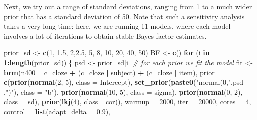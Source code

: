 \documentclass[12pt,]{krantz}
\newenvironment{Shaded}{\begin{snugshade}}{\end{snugshade}}
\newcommand{\CommentTok}[1]{\textcolor[rgb]{0.56,0.35,0.01}{\textit{#1}}}
\newcommand{\ControlFlowTok}[1]{\textcolor[rgb]{0.13,0.29,0.53}{\textbf{#1}}}
\newcommand{\DataTypeTok}[1]{\textcolor[rgb]{0.13,0.29,0.53}{#1}}
\newcommand{\DecValTok}[1]{\textcolor[rgb]{0.00,0.00,0.81}{#1}}
\newcommand{\FloatTok}[1]{\textcolor[rgb]{0.00,0.00,0.81}{#1}}
\newcommand{\KeywordTok}[1]{\textcolor[rgb]{0.13,0.29,0.53}{\textbf{#1}}}
\newcommand{\NormalTok}[1]{#1}
\newcommand{\OperatorTok}[1]{\textcolor[rgb]{0.81,0.36,0.00}{\textbf{#1}}}
\newcommand{\StringTok}[1]{\textcolor[rgb]{0.31,0.60,0.02}{#1}}
\theoremstyle{definition}
\theoremstyle{definition}
\theoremstyle{definition}
\theoremstyle{remark}
\begin{document}
Next, we try out a range of standard deviations, ranging from 1 to a much wider prior that has a standard deviation of 50. Note that such a sensitivity analysis takes a very long time: here, we are running 11 models, where each model involves a lot of iterations to obtain stable Bayes factor estimates.

\begin{Shaded}
\begin{Highlighting}[]
\NormalTok{prior_sd <-}\StringTok{ }\KeywordTok{c}\NormalTok{(}\DecValTok{1}\NormalTok{, }\FloatTok{1.5}\NormalTok{, }\DecValTok{2}\NormalTok{,}\FloatTok{2.5}\NormalTok{, }\DecValTok{5}\NormalTok{, }\DecValTok{8}\NormalTok{, }\DecValTok{10}\NormalTok{, }\DecValTok{20}\NormalTok{, }\DecValTok{40}\NormalTok{, }\DecValTok{50}\NormalTok{)}
\NormalTok{BF <-}\StringTok{ }\KeywordTok{c}\NormalTok{()}
\ControlFlowTok{for}\NormalTok{ (i }\ControlFlowTok{in} \DecValTok{1}\OperatorTok{:}\KeywordTok{length}\NormalTok{(prior_sd)) \{}
\NormalTok{    psd <-}\StringTok{ }\NormalTok{prior_sd[i]}
      \CommentTok{# for each prior we fit the model}
\NormalTok{    fit <-}\StringTok{ }\KeywordTok{brm}\NormalTok{(n400 }\OperatorTok{~}\StringTok{ }\NormalTok{c_cloze }\OperatorTok{+}\StringTok{ }\NormalTok{(c_cloze }\OperatorTok{|}\StringTok{ }\NormalTok{subject) }\OperatorTok{+}\StringTok{ }\NormalTok{(c_cloze }\OperatorTok{|}\StringTok{ }\NormalTok{item),}
               \DataTypeTok{prior =}
                 \KeywordTok{c}\NormalTok{(}\KeywordTok{prior}\NormalTok{(}\KeywordTok{normal}\NormalTok{(}\DecValTok{2}\NormalTok{, }\DecValTok{5}\NormalTok{), }\DataTypeTok{class =}\NormalTok{ Intercept),}
                   \KeywordTok{set_prior}\NormalTok{(}\KeywordTok{paste0}\NormalTok{(}\StringTok{"normal(0,"}\NormalTok{,psd ,}\StringTok{")"}\NormalTok{), }\DataTypeTok{class =} \StringTok{"b"}\NormalTok{),}
                   \KeywordTok{prior}\NormalTok{(}\KeywordTok{normal}\NormalTok{(}\DecValTok{10}\NormalTok{, }\DecValTok{5}\NormalTok{), }\DataTypeTok{class =}\NormalTok{ sigma),}
                   \KeywordTok{prior}\NormalTok{(}\KeywordTok{normal}\NormalTok{(}\DecValTok{0}\NormalTok{, }\DecValTok{2}\NormalTok{), }\DataTypeTok{class =}\NormalTok{ sd),}
                   \KeywordTok{prior}\NormalTok{(}\KeywordTok{lkj}\NormalTok{(}\DecValTok{4}\NormalTok{), }\DataTypeTok{class =}\NormalTok{cor)),}
               \DataTypeTok{warmup  =} \DecValTok{2000}\NormalTok{,}
               \DataTypeTok{iter    =} \DecValTok{20000}\NormalTok{,}
               \DataTypeTok{cores   =} \DecValTok{4}\NormalTok{,}
               \DataTypeTok{control =} \KeywordTok{list}\NormalTok{(}\DataTypeTok{adapt_delta =} \FloatTok{0.9}\NormalTok{),}

\end{Highlighting}
\end{Shaded}
\end{document}
